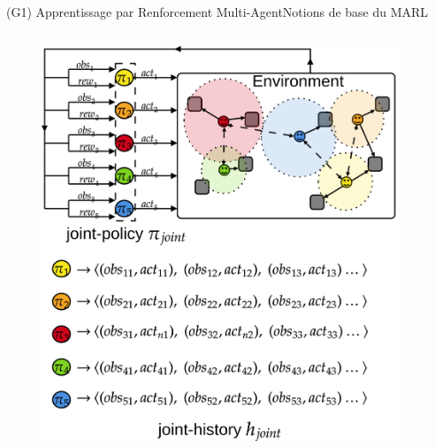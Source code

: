 \begin{frame}{(G1) Apprentissage par Renforcement Multi-Agent}{Notions de base du MARL}

    \begin{columns}

        \hspace{-2ex}

        \begin{column}{0.4\textwidth}

            \begin{figure}
                \includegraphics[width=\linewidth]{figures/marl_basics.png}
            \end{figure}

        \end{column}

        \begin{column}{0.7\textwidth}
            \vspace{-2ex}


\end{column}
\end{columns}
\end{frame}
